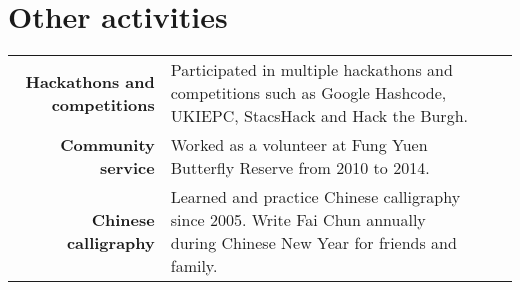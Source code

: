 \documentclass{article}
\newcommand{\n}[0]{\\[\baselineskip]}
\begin{document}
\section*{Other activities}
\begin{tabular}{R|p{15cm}}
\textbf{Hackathons and competitions} & Participated in multiple hackathons and competitions such as Google Hashcode, UKIEPC, StacsHack and Hack the Burgh. \n

\textbf{Community service} & Worked as a volunteer at Fung Yuen Butterfly Reserve from 2010 to 2014. \n

\textbf{Chinese calligraphy} & Learned and practice Chinese calligraphy since 2005. Write Fai Chun annually during Chinese New Year for friends and family. 
\end{tabular}
\end{document}
